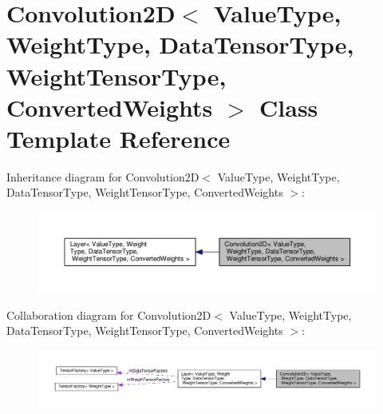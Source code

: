 \hypertarget{classConvolution2D}{}\section{Convolution2D$<$ Value\+Type, Weight\+Type, Data\+Tensor\+Type, Weight\+Tensor\+Type, Converted\+Weights $>$ Class Template Reference}
\label{classConvolution2D}


Inheritance diagram for Convolution2D$<$ Value\+Type, Weight\+Type, Data\+Tensor\+Type, Weight\+Tensor\+Type, Converted\+Weights $>$\+:
\nopagebreak
\begin{figure}[H]
\begin{center}
\leavevmode
\includegraphics[width=350pt]{classConvolution2D__inherit__graph}
\end{center}
\end{figure}


Collaboration diagram for Convolution2D$<$ Value\+Type, Weight\+Type, Data\+Tensor\+Type, Weight\+Tensor\+Type, Converted\+Weights $>$\+:
\nopagebreak
\begin{figure}[H]
\begin{center}
\leavevmode
\includegraphics[width=350pt]{classConvolution2D__coll__graph}
\end{center}
\end{figure}
